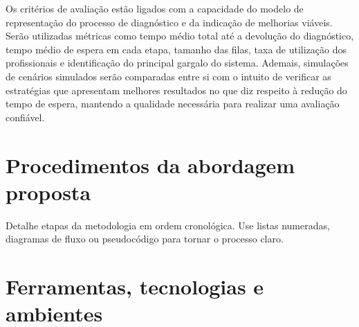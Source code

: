 \documentclass[
    12pt,
    openright,
    oneside,
    a4paper,
    english,
    brazil
]{abntex2}
\begin{document}
Os critérios de avaliação estão ligados com a capacidade do modelo de representação do processo de diagnóstico e da indicação de melhorias viáveis. Serão utilizadas métricas como tempo médio total até a devolução do diagnóstico, tempo médio de espera em cada etapa, tamanho das filas, taxa de utilização dos profissionais e identificação do principal gargalo do sistema. Ademais, simulações de cenários simulados serão comparadas entre si com o intuito de verificar as estratégias que apresentam melhores resultados no que diz respeito à redução do tempo de espera, mantendo a qualidade necessária para realizar uma avaliação confiável.


\section{Procedimentos da abordagem proposta}
Detalhe etapas da metodologia em ordem cronológica. Use listas numeradas, diagramas de fluxo ou pseudocódigo para tornar o processo claro.

\section{Ferramentas, tecnologias e ambientes}

\end{document}
